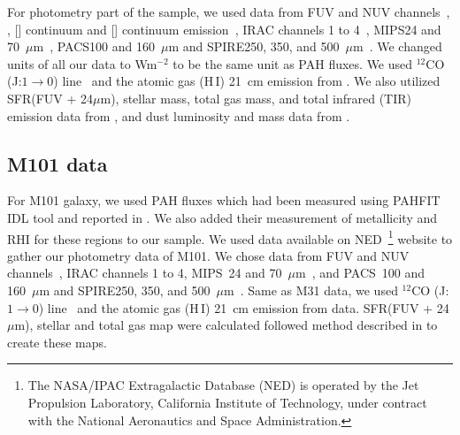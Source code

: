      For photometry part of the sample, we used data from \GALEX FUV and NUV channels~\citep{Martin05}, \halpha, [\sii] continuum and [\oiii] continuum emission~\citep{Massey07}, IRAC channels 1 to 4~\citep{Barmby06}, MIPS24 and 70~$\mu$m~\citep{Gordon06}, PACS100 and 160~$\mu$m and SPIRE250, 350, and 500~$\mu$m~\citep{Fritz12}.
     We changed units of all our data to Wm$^{-2}$ to be the same unit as PAH fluxes.
     We used $^{12}$CO (J:$1\rightarrow0$) line~\citep{Nieten06} and the atomic gas (H\,{\sc I}) 21~cm emission from \cite{Chemin09}.
     We also utilized SFR(FUV + 24$\mu$m), stellar mass, total gas mass, and total infrared (TIR) emission data from \cite{Rahmani16}, and dust luminosity and mass data from \cite{Draine14}.


    \subsection{M101 data}
     For M101 galaxy, we used PAH fluxes which had been measured using {\tiny PAHFIT IDL} tool and reported in \cite{Gordon08}.
     We also added their measurement of metallicity and RHI for these regions to our sample.
     We used data available on NED~\footnote{The NASA/IPAC Extragalactic Database (NED) is operated by the Jet Propulsion Laboratory, California Institute of Technology, under contract with the National Aeronautics and Space Administration.} website to gather our photometry data of M101. 
     We chose data from \GALEX FUV and NUV channels~\citep{depaz07}, IRAC channels 1 to 4, MIPS~24 and 70~$\mu$m~\cite{Dale09}, and  PACS~100 and 160~$\mu$m and SPIRE250, 350, and 500~$\mu$m~\cite{Kennicutt11}.
     Same as M31 data, we used $^{12}$CO (J:$1\rightarrow0$) line~\citep{Helfer03} and the atomic gas (H\,{\sc I}) 21~cm emission from \cite{Walter08} data.
     SFR(FUV + 24$\mu$m), stellar and total gas map were calculated followed method described in \cite{Rahmani16} to create these maps.
     